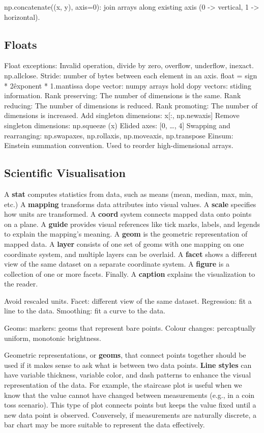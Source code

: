 \documentclass{article}
\begin{document}
np.concatenate((x, y), axis=0): join arrays along existing axis (0 -> vertical, 1 -> horizontal).

\subsection*{Floats}
Float exceptions:
Invalid operation, divide by zero, overflow, underflow, inexact.
np.allclose.
Stride: number of bytes between each element in an axis.
float = sign * 2\^{exponent} * 1.mantissa
dope vector: 
numpy arrays hold dopy vectors: stiding information. 
Rank preserving: The number of dimensions is the same.
Rank reducing: The number of dimensions is reduced.
Rank promoting: The number of dimensions is increased.
Add singleton dimensions: x[:, np.newaxis]
Remove singleton dimensions: np.squeeze (x)
Elided axes: [0, \ldots, 4]
Swapping and rearranging: np.swapaxes, np.rollaxis, np.moveaxis, np.transpose
Einsum: Einstein summation convention. Used to reorder high-dimensional arrays.

\subsection*{Scientific Visualisation}

A \textbf{stat} computes statistics from data, such as means (mean, median, max, min,  etc.)
A \textbf{mapping} transforms data attributes into visual values.
A \textbf{scale} specifies how units are transformed.
A \textbf{coord} system connects mapped data onto points on a plane.
A \textbf{guide} provides visual references like tick marks, labels, and legends to explain the mapping's meaning.
A \textbf{geom} is the geometric representation of mapped data.
A \textbf{layer} consists of one set of geoms with one mapping on one coordinate system, and multiple layers can be overlaid.
A \textbf{facet} shows a different view of the same dataset on a separate coordinate system.
A \textbf{figure} is a collection of one or more facets. Finally.
A \textbf{caption} explains the visualization to the reader.

\noindent Avoid rescaled units. Facet: different view of the same dataset.
Regression: fit a line to the data. Smoothing: fit a curve to the data.

\noindent Geoms: markers: geoms that represent bare points. 
Colour changes: percaptually uniform, monotonic brightness.

\noindent Geometric representations, or \textbf{geoms}, that connect points together should be used if it makes sense to ask what is between two data points. 
\textbf{Line styles} can have variable thickness, variable color, and dash patterns to enhance the visual representation of the data.
For example, the staircase plot is useful when we know that the value cannot have changed between measurements (e.g., in a coin toss scenario). 
This type of plot connects points but keeps the value fixed until a new data point is observed. 
Conversely, if measurements are naturally discrete, a bar chart may be more suitable to represent the data effectively.
\end{document}
